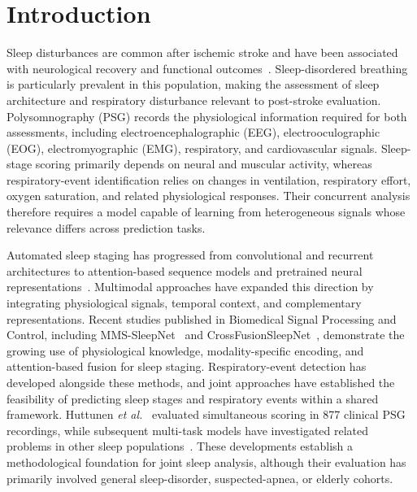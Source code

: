 \documentclass[a4paper,fleqn]{cas-sc}
\begin{document}
\section{Introduction}

Sleep disturbances are common after ischemic stroke and have been associated with neurological recovery and functional outcomes~\cite{bassetti2006sleep,denis2024sleep,tellenbach2023brainstem,johnson2010frequency}. Sleep-disordered breathing is particularly prevalent in this population, making the assessment of sleep architecture and respiratory disturbance relevant to post-stroke evaluation. Polysomnography (PSG) records the physiological information required for both assessments, including electroencephalographic (EEG), electrooculographic (EOG), electromyographic (EMG), respiratory, and cardiovascular signals. Sleep-stage scoring primarily depends on neural and muscular activity, whereas respiratory-event identification relies on changes in ventilation, respiratory effort, oxygen saturation, and related physiological responses. Their concurrent analysis therefore requires a model capable of learning from heterogeneous signals whose relevance differs across prediction tasks.

Automated sleep staging has progressed from convolutional and recurrent architectures to attention-based sequence models and pretrained neural representations~\cite{supratak2017deepsleepnet,phan2019seqsleepnet,eldele2021attnsleep,supratak2020tinysleepnet,labram2024,cbramod2025,eegpt2024,biot2023}. Multimodal approaches have expanded this direction by integrating physiological signals, temporal context, and complementary representations. Recent studies published in Biomedical Signal Processing and Control, including MMS-SleepNet~\cite{mmssleepnet2025} and CrossFusionSleepNet~\cite{crossfusionsleepnet2026}, demonstrate the growing use of physiological knowledge, modality-specific encoding, and attention-based fusion for sleep staging. Respiratory-event detection has developed alongside these methods, and joint approaches have established the feasibility of predicting sleep stages and respiratory events within a shared framework. Huttunen \emph{et al.}~\cite{huttunen2023simultaneous} evaluated simultaneous scoring in 877 clinical PSG recordings, while subsequent multi-task models have investigated related problems in other sleep populations~\cite{multitask2025elderly}. These developments establish a methodological foundation for joint sleep analysis, although their evaluation has primarily involved general sleep-disorder, suspected-apnea, or elderly cohorts.
\end{document}
